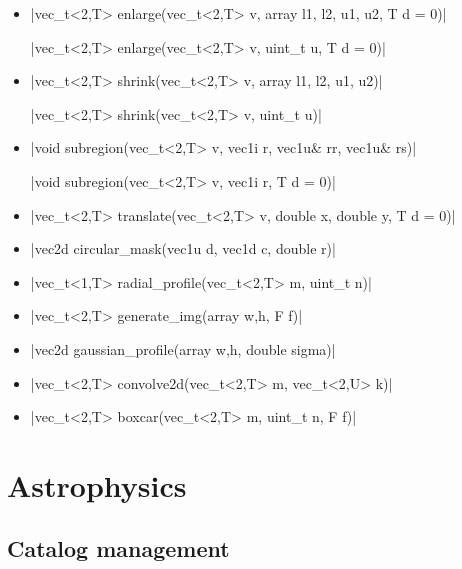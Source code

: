 \documentclass[12pt]{report}
\begin{document}
\begin{itemize}
\item \cppinline|vec_t<2,T> enlarge(vec_t<2,T> v, array {l1, l2, u1, u2}, T d = 0)| 

\cppinline|vec_t<2,T> enlarge(vec_t<2,T> v, uint_t u, T d = 0)|

\item \cppinline|vec_t<2,T> shrink(vec_t<2,T> v, array {l1, l2, u1, u2})| 

\cppinline|vec_t<2,T> shrink(vec_t<2,T> v, uint_t u)|

\item \cppinline|void subregion(vec_t<2,T> v, vec1i r, vec1u& rr, vec1u& rs)| 

\cppinline|void subregion(vec_t<2,T> v, vec1i r, T d = 0)|

\item \cppinline|vec_t<2,T> translate(vec_t<2,T> v, double x, double y, T d = 0)| 

\item \cppinline|vec2d circular_mask(vec1u d, vec1d c, double r)| 

\item \cppinline|vec_t<1,T> radial_profile(vec_t<2,T> m, uint_t n)| 

\item \cppinline|vec_t<2,T> generate_img(array {w,h}, F f)| 

\item \cppinline|vec2d gaussian_profile(array {w,h}, double sigma)| 

\item \cppinline|vec_t<2,T> convolve2d(vec_t<2,T> m, vec_t<2,U> k)| 

\item \cppinline|vec_t<2,T> boxcar(vec_t<2,T> m, uint_t n, F f)| 

\end{itemize}

\section{Astrophysics \label{SEC:support:astro}}

\subsection{Catalog management}
\end{document}
